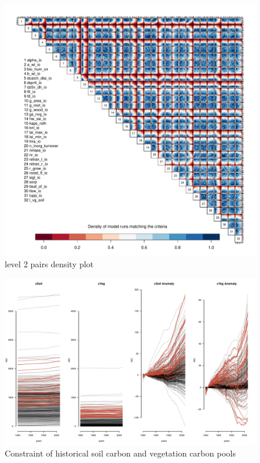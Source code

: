 \documentclass[gmd, manuscript]{copernicus}
\begin{document}
\begin{figure}[t]
\includegraphics[width=12cm]{./graphics/pairs_dens_level2_km.pdf}
\caption{level 2 pairs density plot}
\label{fig:pairs_dens_level1a_km}
\end{figure}





%
\begin{figure}[t]
\includegraphics[width=12cm]{./graphics/vegC-soilC-constrained.pdf}
\caption{Constraint of historical soil carbon and vegetation carbon pools}
\label{fig:vegC-soilC-constrained}
\end{figure}

\end{document}
